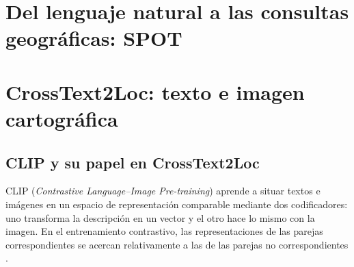 \section{Del lenguaje natural a las consultas geográficas: SPOT}
\label{sec:arte-spot}

\section{CrossText2Loc: texto e imagen cartográfica}
\label{sec:arte-cross}

\subsection{CLIP y su papel en CrossText2Loc}
\label{sec:fundamentos-clip}
CLIP (\emph{Contrastive Language--Image Pre-training}) aprende a situar textos e imágenes en un espacio de representación comparable mediante dos codificadores: uno transforma la descripción en un vector y el otro hace lo mismo con la imagen. En el entrenamiento contrastivo, las representaciones de las parejas correspondientes se acercan relativamente a las de las parejas no correspondientes \cite{radford2021clip}.

